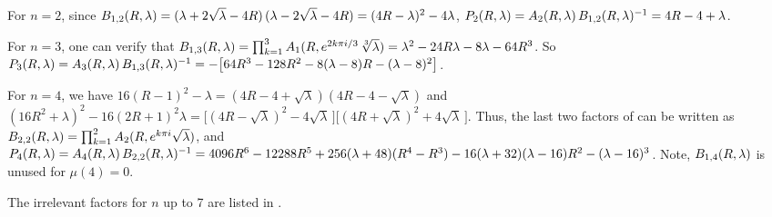 \documentclass[preprint]{revtex4-1}
\begin{document}
For $n = 2$, since
$B_{1,2}(R, \lambda)
=
(\lambda +2\sqrt{\lambda} - 4R)
\,
(\lambda -2\sqrt{\lambda} - 4R)
=(4R-\lambda)^2 -4\lambda$,
%
$P_2(R, \lambda) = A_2(R, \lambda) \, B_{1,2}(R, \lambda)^{-1} = 4R - 4 + \lambda$.



For $n = 3$,
one can verify that
$B_{1,3}(R, \lambda)
= \prod_{k=1}^3 A_1(R, e^{2k\pi i/3} \, \sqrt[3]{\lambda})
=  \lambda^2 - 24 R \lambda - 8 \lambda - 64 R^3$.
%
So
$P_3(R, \lambda) = A_3(R, \lambda) \, B_{1,3}(R, \lambda)^{-1}
= -\big[64 R^3- 128 R^2 -8(\lambda -8)R-(\lambda-8)^2\big]$.



For $n = 4$,
we have
$16 (R-1)^2 - \lambda
= (4R - 4 + \sqrt{\lambda})(4R - 4 - \sqrt{\lambda})$
and
$
(16 R^2 + \lambda)^2 - 16 (2R+1)^2 \lambda
=
\big[(4R - \sqrt{\lambda})^2  - 4\sqrt{\lambda}\,\big]
\big[(4R + \sqrt{\lambda})^2  + 4\sqrt{\lambda}\,\big]$.
Thus, the last two factors of 
can be written as
$B_{2,2}(R, \lambda) = \prod_{k=1}^2 A_2(R, e^{k \pi i} \sqrt{\lambda})$,
and
%
$P_4(R, \lambda)
    = A_4(R, \lambda) \, B_{2,2}(R, \lambda)^{-1}
    = 4096 R^6-12288 R^5+ 256 (\lambda + 48) (R^4- R^3)
    -16(\lambda + 32)(\lambda - 16) R^2 - (\lambda-16)^3$.
Note, $B_{1,4}(R, \lambda)$ is unused for $\mu(4) = 0$.


The irrelevant factors for $n$ up to 7 are listed in .



\newcommand{\T}{{R_4}}
\end{document}
